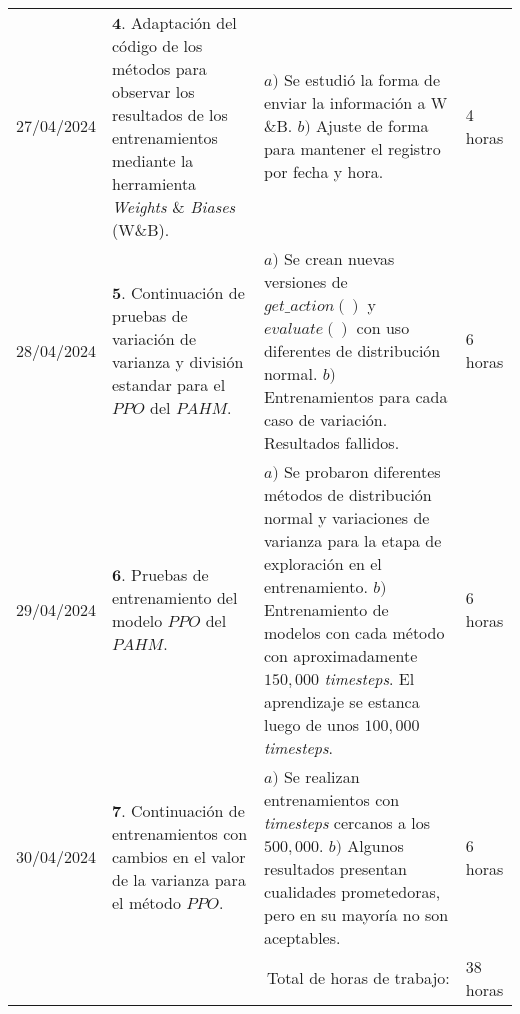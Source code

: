 \documentclass[12pt]{article}
\begin{document}
\hfill\\
\begin{minipage}[h]{\textwidth}
	\centering
	\begin{tabularx}{\textwidth}{|p{2cm}|X|X|p{2cm}|} 
		\hline		
		
	 	27/04/2024 & 
	 	$\mathbf{4}.$ Adaptación del código de los métodos para observar los resultados de los entrenamientos mediante la herramienta \textit{Weights $\&$ Biases} (W$\&$B). &
	 	$a)$ Se estudió la forma de enviar la información a W$\&$B. \newline
	 	$b)$ Ajuste de forma para mantener el registro por fecha y hora. \newline & 
	 	4 horas \\
	 	28/04/2024 & 
	 	$\mathbf{5}.$ Continuación de pruebas de variación de varianza y división estandar para el $PPO$ del $PAHM$. &
	 	$a)$ Se crean nuevas versiones de $get\_ action()$ y $evaluate()$ con uso diferentes de distribución normal. \newline
	 	$b)$ Entrenamientos para cada caso de variación. Resultados fallidos. \newline & 
	 	6 horas \\
	 	29/04/2024 & 
	 	$\mathbf{6}.$ Pruebas de entrenamiento del modelo $PPO$ del $PAHM$. &
	 	$a)$ Se probaron diferentes métodos de distribución normal y variaciones de varianza para la etapa de exploración en el entrenamiento. \newline
	 	$b)$ Entrenamiento de modelos con cada método con aproximadamente $150,000$ \textit{timesteps}. El aprendizaje se estanca luego de unos $100,000$ \textit{timesteps}.  \newline & 
	 	6 horas \\ 
	 	30/04/2024 & 
	 	$\mathbf{7}.$ Continuación de entrenamientos con cambios en el valor de la varianza para el método $PPO$. &
	 	$a)$ Se realizan entrenamientos con \textit{timesteps} cercanos a los $500,000$. \newline
	 	$b)$ Algunos resultados presentan cualidades prometedoras, pero en su mayoría no son aceptables. \newline & 
	 	6 horas \\
	 	
	 	\hline
		\multicolumn{3}{|r|}{Total de horas de trabajo:} & 38 horas \\ 
	 	\hline                 
	\end{tabularx}
\end{minipage}
\end{document}
